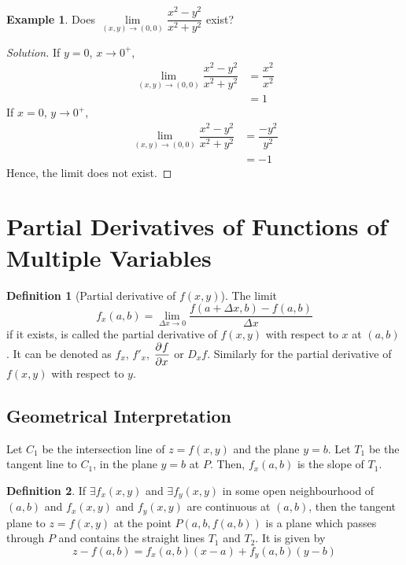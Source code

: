 \documentclass[fleqn, a4paper, 12pt]{article}
\theoremstyle{definition}
\newtheorem{example}{Example}
\newtheorem{definition}{Definition}
\theoremstyle{theorem}
\theoremstyle{remark}
\newenvironment{solution}
{\begin{proof}[Solution]\let\qed\relax}
	{\end{proof}}
\begin{document}
\begin{example}
	Does $\lim\limits_{(x,y) \to (0,0)} \dfrac{x^2 - y^2}{x^2 + y^2}$ exist?
\end{example}

\begin{solution}
	If $y = 0$, $x \to 0^+$,
	\begin{align*}
		\lim\limits_{(x,y) \to (0,0)} \dfrac{x^2 - y^2}{x^2 + y^2} &= \dfrac{x^2}{x^2}\\
		&= 1
	\end{align*}
	If $x = 0$, $y \to 0^+$,
	\begin{align*}
	\lim\limits_{(x,y) \to (0,0)} \dfrac{x^2 - y^2}{x^2 + y^2} &= \dfrac{-y^2}{y^2}\\
	&= -1
	\end{align*}
	Hence, the limit does not exist.
\end{solution}

\section{Partial Derivatives of Functions of Multiple Variables}

\begin{definition}[Partial derivative of $f(x,y)$]
	The limit
	\begin{equation*}
		f_x(a,b) = \lim\limits_{\Delta x \to 0} \dfrac{f(a + \Delta x, b) - f(a, b)}{\Delta x}
	\end{equation*}
	if it exists, is called the partial derivative of $f(x, y)$ with respect to $x$ at $(a, b)$. It can be denoted as $f_x$, $f'_x$, $\dpd{f}{x}$ or $D_x f$. Similarly for the partial derivative of $f(x, y)$ with respect to $y$.
\end{definition}

\subsection{Geometrical Interpretation}

Let $C_1$ be the intersection line of $z = f(x,y)$ and the plane $y = b$. Let $T_1$ be the tangent line to $C_1$, in the plane $y = b$ at $P$. Then, $f_x(a,b)$ is the slope of $T_1$.

\begin{definition}
	If $\exists f_x(x,y)$ and $\exists f_y(x,y)$ in some open neighbourhood of $(a,b)$ and $f_x(x,y)$ and $f_y(x,y)$ are continuous at $(a,b)$, then the tangent plane to $z = f(x,y)$ at the point $P(a, b, f(a,b))$ is a plane which passes through $P$ and contains the straight lines $T_1$ and $T_2$. It is given by
	\begin{equation*}
		z - f(a,b) = f_x(a,b) (x - a) + f_y(a,b) (y - b)
	\end{equation*}
\end{definition}
\end{document}
